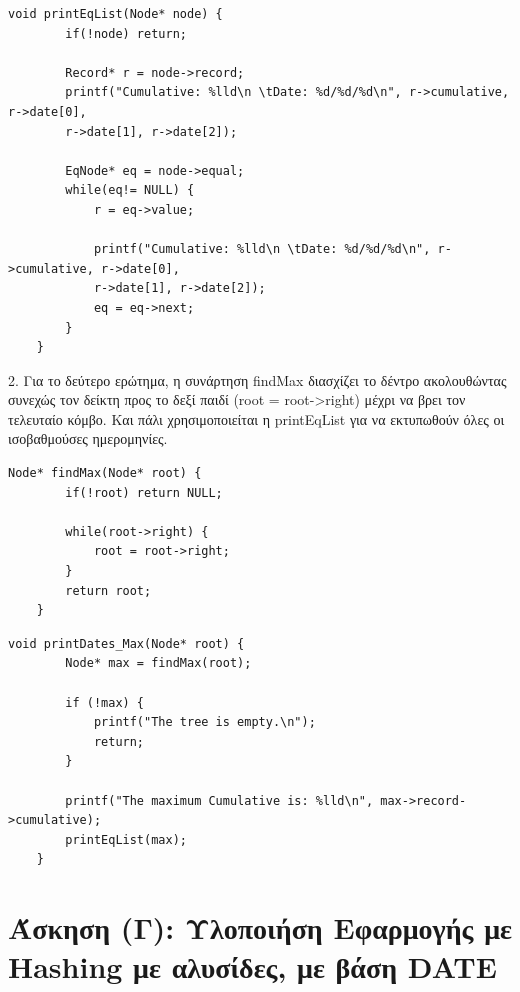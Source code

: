\documentclass[a4paper,12pt]{article}
\begin{document}
\begin{lstlisting}[caption={Συνάρτηση printEqList}]
	void printEqList(Node* node) {
		if(!node) return;
		
		Record* r = node->record;
		printf("Cumulative: %lld\n \tDate: %d/%d/%d\n", r->cumulative, r->date[0], 
		r->date[1], r->date[2]);
		
		EqNode* eq = node->equal;
		while(eq!= NULL) {
			r = eq->value;
			
			printf("Cumulative: %lld\n \tDate: %d/%d/%d\n", r->cumulative, r->date[0], 
			r->date[1], r->date[2]);
			eq = eq->next;
		}
	}
\end{lstlisting}
2. Για το δεύτερο ερώτημα, η συνάρτηση findMax διασχίζει το δέντρο ακολουθώντας συνεχώς τον δείκτη προς το δεξί παιδί (root = root->right) μέχρι να βρει τον τελευταίο κόμβο. Και πάλι χρησιμοποιείται η printEqList για να εκτυπωθούν όλες οι ισοβαθμούσες ημερομηνίες.\\
\begin{lstlisting}[caption={Συνάρτηση findMax}]
	Node* findMax(Node* root) {
		if(!root) return NULL;
		
		while(root->right) {
			root = root->right;
		}
		return root;
	}
\end{lstlisting}
\begin{lstlisting}[caption={Συνάρτηση printDates\_Max}]
	void printDates_Max(Node* root) {
		Node* max = findMax(root);
		
		if (!max) {
			printf("The tree is empty.\n");
			return;
		}
		
		printf("The maximum Cumulative is: %lld\n", max->record->cumulative);
		printEqList(max);
	}
\end{lstlisting}

\section{Άσκηση (Γ): Υλοποιήση Εφαρμογής με Hashing με αλυσίδες, με βάση DATE}
\end{document}
